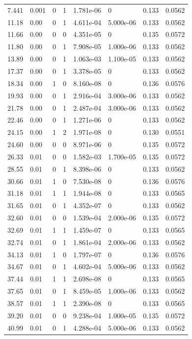 \documentclass[preview]{standalone}
\begin{document}
{{\begin{tabular}{L{1.2cm}C{1.2cm} C{0.3cm}C{0.5cm} C{1.4cm}C{1.4cm} C{1.4cm}C{1.4cm}}
  7.441  &  0.001  & 0     &  1 &  1.781e-06  & 0  & 0.133 &  0.0562   \\ 
  11.18  &  0.00  & 0     &  1 &  4.611e-04  & 5.000e-06  & 0.133 &  0.0562   \\ 
  11.66  &  0.00  & 0     &  0 &  4.351e-05  & 0  & 0.135 &  0.0572   \\ 
  11.80  &  0.00  & 0     &  1 &  7.908e-05  & 1.000e-06  & 0.133 &  0.0562   \\ 
  13.89  &  0.00  & 0     &  1 &  1.063e-03  & 1.100e-05  & 0.133 &  0.0562   \\ 
  17.37  &  0.00  & 0     &  1 &  3.378e-05  & 0  & 0.133 &  0.0562   \\ 
  18.34  &  0.00  & 1     &  0 &  8.160e-08  & 0  & 0.136 &  0.0576   \\ 
  19.93  &  0.00  & 0     &  1 &  2.916e-04  & 3.000e-06  & 0.133 &  0.0562   \\ 
  21.78  &  0.00  & 0     &  1 &  2.487e-04  & 3.000e-06  & 0.133 &  0.0562   \\ 
  22.46  &  0.00  & 0     &  1 &  1.271e-06  & 0  & 0.133 &  0.0562   \\ 
  24.15  &  0.00  & 1     &  2 &  1.971e-08  & 0  & 0.130 &  0.0551   \\ 
  24.60  &  0.00  & 0     &  0 &  8.971e-06  & 0  & 0.135 &  0.0572   \\ 
  26.33  &  0.01  & 0     &  0 &  1.582e-03  & 1.700e-05  & 0.135 &  0.0572   \\ 
  28.55  &  0.01  & 0     &  1 &  8.398e-06  & 0  & 0.133 &  0.0562   \\ 
  30.66  &  0.01  & 1     &  0 &  7.530e-08  & 0  & 0.136 &  0.0576   \\ 
  31.18  &  0.01  & 1     &  1 &  1.944e-08  & 0  & 0.133 &  0.0565   \\ 
  31.65  &  0.01  & 0     &  1 &  4.352e-07  & 0  & 0.133 &  0.0562   \\ 
  32.60  &  0.01  & 0     &  0 &  1.539e-04  & 2.000e-06  & 0.135 &  0.0572   \\ 
  32.69  &  0.01  & 1     &  1 &  1.459e-07  & 0  & 0.133 &  0.0565   \\ 
  32.74  &  0.01  & 0     &  1 &  1.861e-04  & 2.000e-06  & 0.133 &  0.0562   \\ 
  34.13  &  0.01  & 1     &  0 &  1.797e-07  & 0  & 0.136 &  0.0576   \\ 
  34.67  &  0.01  & 0     &  1 &  4.602e-04  & 5.000e-06  & 0.133 &  0.0562   \\ 
  37.44  &  0.01  & 1     &  1 &  2.698e-08  & 0  & 0.133 &  0.0565   \\ 
  37.65  &  0.01  & 0     &  1 &  8.459e-05  & 1.000e-06  & 0.133 &  0.0562   \\ 
  38.57  &  0.01  & 1     &  1 &  2.390e-08  & 0  & 0.133 &  0.0565   \\ 
  39.20  &  0.01  & 0     &  0 &  9.238e-04  & 1.000e-05  & 0.135 &  0.0572   \\ 
  40.99  &  0.01  & 0     &  1 &  4.288e-04  & 5.000e-06  & 0.133 &  0.0562   \\ 
\hline 
\end{tabular} 

}}
\end{document}
